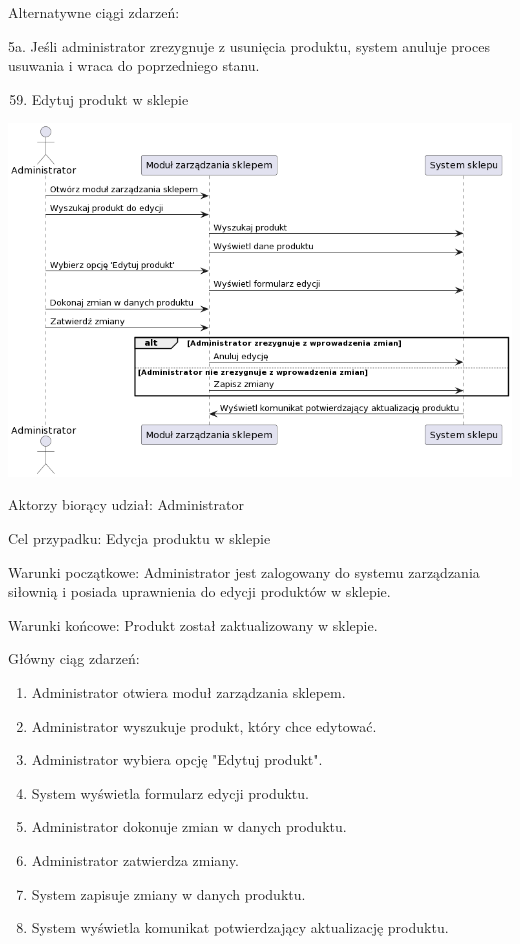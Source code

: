 \documentclass[
]{article}
\providecommand{\tightlist}{%
  \setlength{\itemsep}{0pt}\setlength{\parskip}{0pt}}
\begin{document}
{Alternatywne ciągi zdarzeń:}

{5a. Jeśli administrator zrezygnuje z usunięcia produktu, system anuluje
proces usuwania i wraca do poprzedniego stanu.}

{}

{}

\begin{enumerate}
\setcounter{enumi}{58}
\tightlist
\item
  {Edytuj produkt w sklepie}
\end{enumerate}

{\includegraphics{diagrams/sequence/sklep_edycja_produktu.png}}

{Aktorzy biorący udział: Administrator}

{Cel przypadku: Edycja produktu w sklepie}

{Warunki początkowe: Administrator jest zalogowany do systemu
zarządzania siłownią i posiada uprawnienia do edycji produktów w
sklepie.}

{Warunki końcowe: Produkt został zaktualizowany w sklepie.}

{Główny ciąg zdarzeń:}

\begin{enumerate}
\tightlist
\item
  {Administrator otwiera moduł zarządzania sklepem.}
\item
  {Administrator wyszukuje produkt, który chce edytować.}
\item
  {Administrator wybiera opcję "Edytuj produkt".}
\item
  {System wyświetla formularz edycji produktu.}
\item
  {Administrator dokonuje zmian w danych produktu.}
\item
  {Administrator zatwierdza zmiany.}
\item
  {System zapisuje zmiany w danych produktu.}
\item
  {System wyświetla komunikat potwierdzający aktualizację produktu.}
\end{enumerate}
\end{document}
